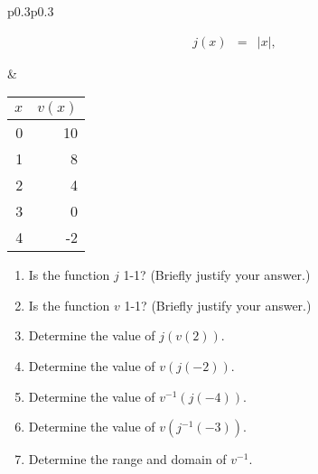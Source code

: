 \begin{enumerate}
  \begin{tabular}{p{0.3\textwidth}p{0.3\textwidth}}
    \begin{minipage}{0.3\linewidth}
      \begin{eqnarray*}
        j(x) & = & |x|,
      \end{eqnarray*}
    \end{minipage}
    &
      \begin{minipage}{0.3\linewidth}
        \begin{tabular}{r|r}
          $x$ & $v(x)$ \\ \hline
          0 & 10 \\
          1 &  8 \\
          2 &  4 \\
          3 &  0 \\
          4 & -2
        \end{tabular}
      \end{minipage}
  \end{tabular}

  \begin{enumerate}
  \item  Is the function $j$ 1-1? (Briefly justify your answer.)
  \item  Is the function $v$ 1-1? (Briefly justify your answer.)
  \item  Determine the value of $j(v(2))$.
  \item  Determine the value of  $v(j(-2))$.
  \item  Determine the value of $v^{-1}(j(-4))$.
  \item  Determine the value of $v(j^{-1}(-3))$.
  \item  Determine the range and domain of $v^{-1}$.
  \end{enumerate}


\end{enumerate}


